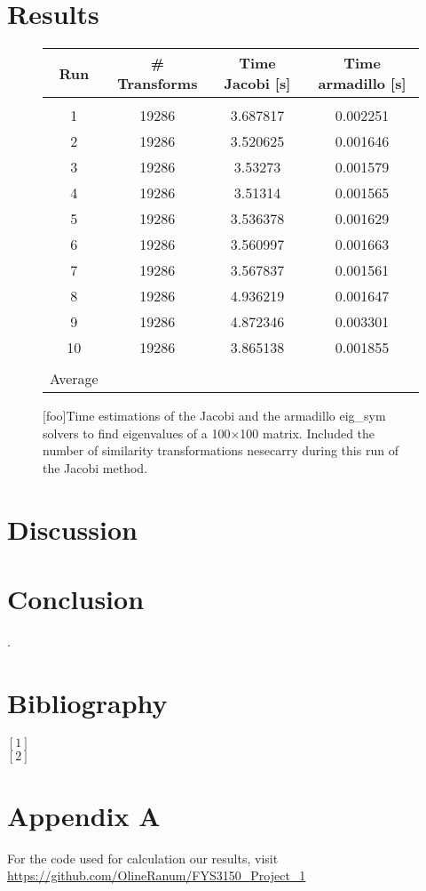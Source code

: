 \documentclass[%
reprint,
amsmath,amssymb,
aps,
]{revtex4-1}
\begin{document}
\section*{Results}
\begin{figure}[!h]
	\begin{tabular} {|c|c|c|c|}
		\hline
		Run & \# Transforms & Time Jacobi [s] & Time armadillo [s] \\ 
		\hline
		&&& \\ 
		1 & 19286 & 3.687817             & 0.002251            \\ 
		2 & 19286 & 3.520625             & 0.001646            \\ 
		3 & 19286 & 3.53273             & 0.001579            \\ 
		4 & 19286 & 3.51314             & 0.001565            \\ 
		5 & 19286 & 3.536378             & 0.001629            \\ 
		6 & 19286 & 3.560997             & 0.001663            \\ 
		7 & 19286 & 3.567837             & 0.001561            \\ 
		8 & 19286 & 4.936219             & 0.001647            \\ 
		9 & 19286 & 4.872346             & 0.003301            \\ 
		10 & 19286 & 3.865138             & 0.001855            \\ 
		\hline 
		& & &\\
		Average &&& \\ 
		\hline
	\end{tabular}
	\label{tab1}
	[foo]{Time estimations of the Jacobi and the armadillo eig\_sym solvers to find eigenvalues of a 100$\times$100 matrix. Included the number of similarity transformations nesecarry during this run of the Jacobi method.}
\end{figure}

\section*{Discussion} 

\section*{Conclusion}


\newpage .
\newpage 
\onecolumngrid
\section*{Bibliography}
\noindent $[1]$ \\ 
$[2]$
\section*{Appendix A}
For the code used for calculation our results, visit
\url{https://github.com/OlineRanum/FYS3150_Project_1}
\end{document}
